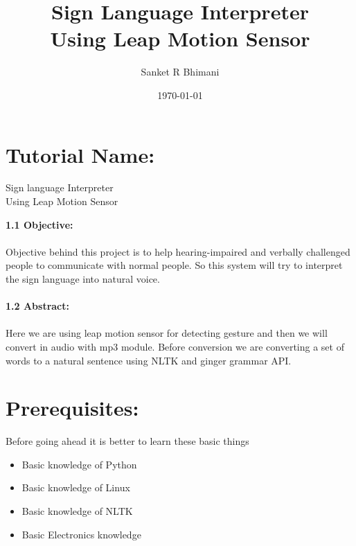 \documentclass[11pt,a4paper]{article}
\title{\textbf{\Huge{Sign Language Interpreter}}\vspace{6mm}\\Using Leap Motion Sensor}
\author{Sanket R Bhimani}
\date{\today}
\newcommand\tab[1][1cm]{\hspace*{#1}}
\begin{document}
	\maketitle
	\newpage
	\tableofcontents
	\newpage
	\section{Tutorial Name:}
	\begin{center}\huge{Sign language Interpreter}\\\Large{Using Leap Motion Sensor}\end{center}
	\vspace{15mm}
	\textbf{\Large{1.1 Objective:}}\\
	\vspace{1mm}\\
	Objective behind this project is to help hearing-impaired and verbally challenged people to communicate with normal people. So this system will try to interpret the sign language into natural voice.\\
	\vspace{6mm}\\
	\textbf{\Large{1.2 Abstract:}}\\
	\vspace{1mm}\\
	Here we are using leap motion sensor for detecting gesture and then we will convert in audio with mp3 module. Before conversion we are converting a set of words to a natural sentence using NLTK and ginger grammar API.
	\newpage
	\section{Prerequisites:}
	\vspace{1cm}
	\tab Before going ahead it is better to learn these basic things
    \vspace{1cm}
	\begin{itemize}
	    \item Basic knowledge of Python
	    \item Basic knowledge of Linux
	    \item Basic knowledge of NLTK
	    \item Basic Electronics knowledge
	\end{itemize}
	\newpage
\end{document}
